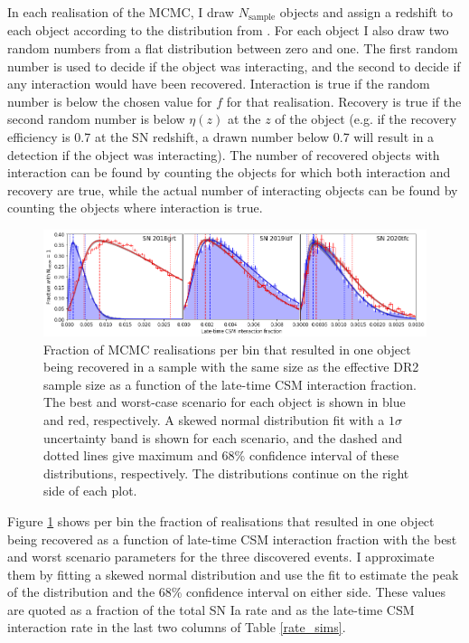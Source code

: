\documentclass[a4paper,oneside,12pt, class=Latex/Classes/PhDthesisPSnPDF, crop=false]{standalone}
\begin{document}
In each realisation of the MCMC, I draw $N_\text{sample}$ objects and assign a redshift to each object according to the distribution from \citet{SNIa_rate}. For each object I also draw two random numbers from a flat distribution between zero and one. The first random number is used to decide if the object was interacting, and the second to decide if any interaction would have been recovered. Interaction is true if the random number is below the chosen value for $f$ for that realisation. Recovery is true if the second random number is below $\eta(z)$ at the $z$ of the object (e.g. if the recovery efficiency is 0.7 at the SN redshift, a drawn number below 0.7 will result in a detection if the object was interacting). The number of recovered objects with interaction can be found by counting the objects for which both interaction and recovery are true, while the actual number of interacting objects can be found by counting the objects where interaction is true.

\begin{figure}
 \centering
 \includegraphics[width=\textwidth]{../Images/chapter_3/rateplots.png}
 \caption[Chance of one detected event vs. late-time CSM interaction fraction]{Fraction of MCMC realisations per bin that resulted in one object being recovered in a sample with the same size as the effective DR2 sample size as a function of the late-time CSM interaction fraction. The best and worst-case scenario for each object is shown in blue and red, respectively. A skewed normal distribution fit with a $1 \sigma$ uncertainty band is shown for each scenario, and the dashed and dotted lines give maximum and 68\% confidence interval of these distributions, respectively. The distributions continue on the right side of each plot.}
 \label{rate_fig}
\end{figure}

Figure \ref{rate_fig} shows per bin the fraction of realisations that resulted in one object being recovered as a function of late-time CSM interaction fraction with the best and worst scenario parameters for the three discovered events. I approximate them by fitting a skewed normal distribution and use the fit to estimate the peak of the distribution and the 68\% confidence interval on either side. These values are quoted as a fraction of the total SN Ia rate and as the late-time CSM interaction rate in the last two columns of Table \ref{rate_sims}.
\end{document}

